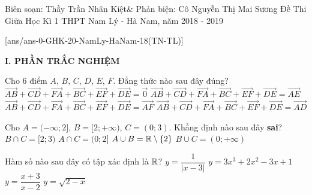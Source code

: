 \begin{name}
{Biên soạn: Thầy Trần Nhân Kiệt\newline \& Phản biện: Cô Nguyễn Thị Mai Sương }
{Đề Thi Giữa Học Kì 1 THPT Nam Lý - Hà Nam, năm 2018 - 2019}
\end{name}

\setcounter{ex}{0}\setcounter{bt}{0}
[ans/ans-0-GHK-20-NamLy-HaNam-18(TN-TL)]

\noindent\textbf{I. PHẦN TRẮC NGHIỆM}

\begin{ex}%
Cho $6$ điểm $A$, $B$, $C$, $D$, $E$, $F$. Đẳng thức nào sau đây đúng?
	\choice
	{\True $\overrightarrow{AB}+\overrightarrow{CD}+\overrightarrow{FA}+\overrightarrow{BC}+\overrightarrow{EF}+\overrightarrow{DE}=\overrightarrow{0}$}
	{$\overrightarrow{AB}+\overrightarrow{CD}+\overrightarrow{FA}+\overrightarrow{BC}+\overrightarrow{EF}+\overrightarrow{DE}=\overrightarrow{AE}$}
	{$\overrightarrow{AB}+\overrightarrow{CD}+\overrightarrow{FA}+\overrightarrow{BC}+\overrightarrow{EF}+\overrightarrow{DE}=\overrightarrow{AF}$}
	{$\overrightarrow{AB}+\overrightarrow{CD}+\overrightarrow{FA}+\overrightarrow{BC}+\overrightarrow{EF}+\overrightarrow{DE}=\overrightarrow{AD}$}
\end{ex}

\begin{ex}%
Cho $A=(-\infty;2]$, $B=[2;+\infty)$, $C=(0;3)$. Khẳng định nào sau đây {\bf sai}?
	\choice
	{$B\cap C=[2;3)$}
	{$A\cap C=(0;2]$}
	{\True $A\cup B=\Bbb{R}\setminus \{2\}$}
	{$B\cup C=(0;+\infty)$}
\end{ex}

\begin{ex}%
Hàm số nào sau đây có tập xác định là $\Bbb{R}$?
	\choice
	{$y=\dfrac{1}{|x-3|}$}
	{\True $y=3x^3+2x^2-3x+1$}
	{$y=\dfrac{x+3}{x-2}$}
	{$y=\sqrt{2-x}$}
\end{ex}

